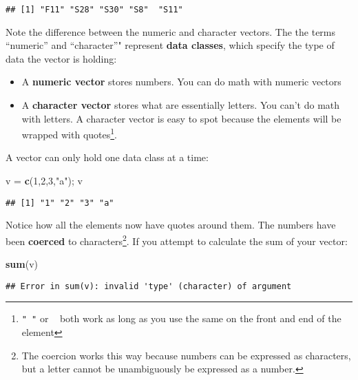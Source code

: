 \documentclass[]{book}
\newenvironment{Shaded}{\begin{snugshade}}{\end{snugshade}}
\newcommand{\KeywordTok}[1]{\textcolor[rgb]{0.13,0.29,0.53}{\textbf{#1}}}
\newcommand{\DecValTok}[1]{\textcolor[rgb]{0.00,0.00,0.81}{#1}}
\newcommand{\StringTok}[1]{\textcolor[rgb]{0.31,0.60,0.02}{#1}}
\newcommand{\NormalTok}[1]{#1}
\providecommand{\tightlist}{%
  \setlength{\itemsep}{0pt}\setlength{\parskip}{0pt}}
\let\rmarkdownfootnote\footnote%
\def\footnote{\protect\rmarkdownfootnote}
\theoremstyle{definition}
\theoremstyle{definition}
\theoremstyle{definition}
\theoremstyle{remark}
\begin{document}
\begin{verbatim}
## [1] "F11" "S28" "S30" "S8"  "S11"
\end{verbatim}

Note the difference between the numeric and character vectors. The the
terms ``numeric'' and ``character''" represent \textbf{data classes},
which specify the type of data the vector is holding:

\begin{itemize}
\tightlist
\item
  A \textbf{numeric vector} stores numbers. You can do math with numeric
  vectors
\item
  A \textbf{character vector} stores what are essentially letters. You
  can't do math with letters. A character vector is easy to spot because
  the elements will be wrapped with quotes\footnote{\texttt{"\ "} or
    \texttt{\textquotesingle{}\ \textquotesingle{}} both work as long as
    you use the same on the front and end of the element}.
\end{itemize}

A vector can only hold one data class at a time:

\begin{Shaded}
\begin{Highlighting}[]
\NormalTok{v =}\StringTok{ }\KeywordTok{c}\NormalTok{(}\DecValTok{1}\NormalTok{,}\DecValTok{2}\NormalTok{,}\DecValTok{3}\NormalTok{,}\StringTok{"a"}\NormalTok{); v}
\end{Highlighting}
\end{Shaded}

\begin{verbatim}
## [1] "1" "2" "3" "a"
\end{verbatim}

Notice how all the elements now have quotes around them. The numbers
have been \textbf{coerced} to characters\footnote{The coercion works
  this way because numbers can be expressed as characters, but a letter
  cannot be unambiguously be expressed as a number.}. If you attempt to
calculate the sum of your vector:

\begin{Shaded}
\begin{Highlighting}[]
\KeywordTok{sum}\NormalTok{(v)}
\end{Highlighting}
\end{Shaded}

\begin{verbatim}
## Error in sum(v): invalid 'type' (character) of argument
\end{verbatim}
\end{document}
